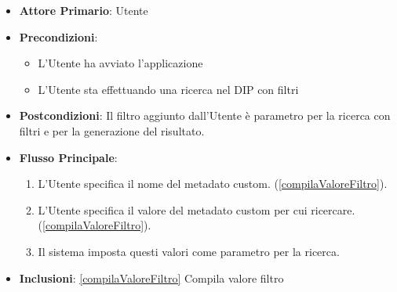 \begin{itemize}
      \item \textbf{Attore Primario}: Utente
      \item \textbf{Precondizioni}: \begin{itemize}
            \item L'Utente ha avviato l'applicazione
            \item L'Utente sta effettuando una ricerca nel DIP con filtri
            \end{itemize}
      \item \textbf{Postcondizioni}: Il filtro aggiunto dall'Utente è parametro per la ricerca con filtri e per la generazione del risultato.
      \item \textbf{Flusso Principale}:
      \begin{enumerate}
            \item L'Utente specifica il nome del metadato custom. (\ref{compilaValoreFiltro}).
            \item L'Utente specifica il valore del metadato custom per cui ricercare. (\ref{compilaValoreFiltro}).
            \item Il sistema imposta questi valori come parametro per la ricerca.
      \end{enumerate}
      \item \textbf{Inclusioni}: \ref{compilaValoreFiltro} Compila valore filtro
\end{itemize}

